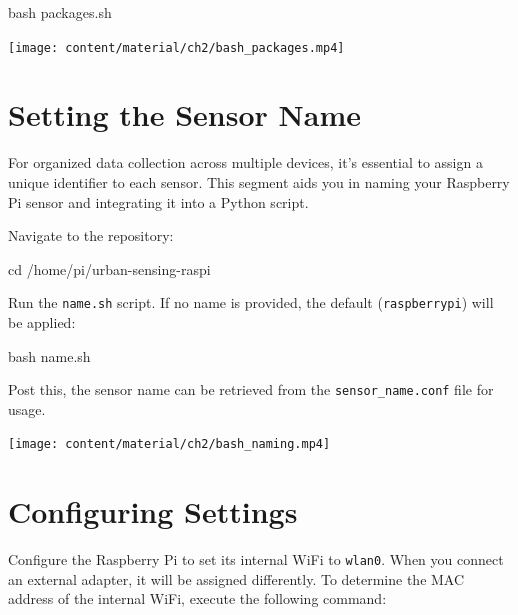 \documentclass[
  letterpaper,
]{scrbook}
\newenvironment{Shaded}{\begin{snugshade}}{\end{snugshade}}
\newcommand{\BuiltInTok}[1]{\textcolor[rgb]{0.00,0.23,0.31}{#1}}
\newcommand{\FunctionTok}[1]{\textcolor[rgb]{0.28,0.35,0.67}{#1}}
\newcommand{\NormalTok}[1]{\textcolor[rgb]{0.00,0.23,0.31}{#1}}
\begin{document}
\begin{Shaded}
\begin{Highlighting}[]
\FunctionTok{bash}\NormalTok{ packages.sh}
\end{Highlighting}
\end{Shaded}

\texttt{[image: content/material/ch2/bash\_packages.mp4]}

\hypertarget{setting-the-sensor-name}{%
\section{Setting the Sensor Name}\label{setting-the-sensor-name}}

For organized data collection across multiple devices, it's essential to
assign a unique identifier to each sensor. This segment aids you in
naming your Raspberry Pi sensor and integrating it into a Python script.

Navigate to the repository:

\begin{Shaded}
\begin{Highlighting}[]
\BuiltInTok{cd}\NormalTok{ /home/pi/urban{-}sensing{-}raspi}
\end{Highlighting}
\end{Shaded}

Run the \texttt{name.sh} script. If no name is provided, the default
(\texttt{raspberrypi}) will be applied:

\begin{Shaded}
\begin{Highlighting}[]
\FunctionTok{bash}\NormalTok{ name.sh}
\end{Highlighting}
\end{Shaded}

Post this, the sensor name can be retrieved from the
\texttt{sensor\_name.conf} file for usage.

\texttt{[image: content/material/ch2/bash\_naming.mp4]}

\hypertarget{configuring-settings}{%
\section{Configuring Settings}\label{configuring-settings}}

Configure the Raspberry Pi to set its internal WiFi to \texttt{wlan0}.
When you connect an external adapter, it will be assigned differently.
To determine the MAC address of the internal WiFi, execute the following
command:
\end{document}
